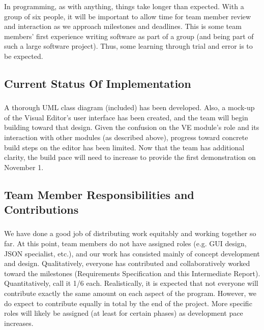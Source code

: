 \documentclass{llncs}
\begin{document}
\subsubsection{}
In programming, as with anything, things take longer than expected. With a group of six people, it will be important to allow time for team member review and interaction as we approach milestones and deadlines.  This is some team members’ first experience writing software as part of a group (and being part of such a large software project).  Thus, some learning through trial and error is to be expected.


\subsection{Current Status Of Implementation}
\subsubsection{}
A thorough UML class diagram (included) has been developed.  Also, a mock-up of the Visual Editor’s user interface has been created, and the team will begin building toward that design. Given the confusion on the VE module’s role and its interaction with other modules (as described above), progress toward concrete build steps on the editor has been limited.  Now that the team has additional clarity, the build pace will need to increase to provide the first demonstration on November 1.  

\subsection{Team Member Responsibilities and Contributions}
\subsubsection{}We have done a good job of distributing work equitably and working together so far.  At this point, team members do not have assigned roles (e.g. GUI design, JSON specialist, etc.), and our work has consisted mainly of concept development and design.  Qualitatively, everyone has contributed and collaboratively worked toward the milestones (Requirements Specification and this Intermediate Report).  Quantitatively, call it 1/6 each.  Realistically, it is expected that not everyone will contribute exactly the same amount on each aspect of the program.  However, we do expect to contribute equally in total by the end of the project.  More specific roles will likely be assigned (at least for certain phases) as development pace increases.
\end{document}

